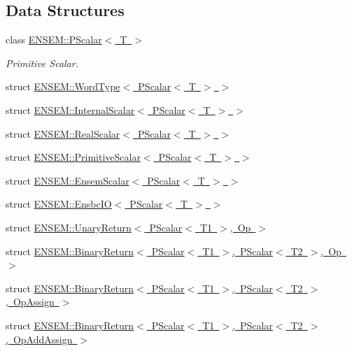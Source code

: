 \subsection*{Data Structures}
\begin{DoxyCompactItemize}
\item 
class \mbox{\hyperlink{classENSEM_1_1PScalar}{E\+N\+S\+E\+M\+::\+P\+Scalar$<$ T $>$}}
\begin{DoxyCompactList}\small\item\em Primitive Scalar. \end{DoxyCompactList}\item 
struct \mbox{\hyperlink{structENSEM_1_1WordType_3_01PScalar_3_01T_01_4_01_4}{E\+N\+S\+E\+M\+::\+Word\+Type$<$ P\+Scalar$<$ T $>$ $>$}}
\item 
struct \mbox{\hyperlink{structENSEM_1_1InternalScalar_3_01PScalar_3_01T_01_4_01_4}{E\+N\+S\+E\+M\+::\+Internal\+Scalar$<$ P\+Scalar$<$ T $>$ $>$}}
\item 
struct \mbox{\hyperlink{structENSEM_1_1RealScalar_3_01PScalar_3_01T_01_4_01_4}{E\+N\+S\+E\+M\+::\+Real\+Scalar$<$ P\+Scalar$<$ T $>$ $>$}}
\item 
struct \mbox{\hyperlink{structENSEM_1_1PrimitiveScalar_3_01PScalar_3_01T_01_4_01_4}{E\+N\+S\+E\+M\+::\+Primitive\+Scalar$<$ P\+Scalar$<$ T $>$ $>$}}
\item 
struct \mbox{\hyperlink{structENSEM_1_1EnsemScalar_3_01PScalar_3_01T_01_4_01_4}{E\+N\+S\+E\+M\+::\+Ensem\+Scalar$<$ P\+Scalar$<$ T $>$ $>$}}
\item 
struct \mbox{\hyperlink{structENSEM_1_1EnsbcIO_3_01PScalar_3_01T_01_4_01_4}{E\+N\+S\+E\+M\+::\+Ensbc\+I\+O$<$ P\+Scalar$<$ T $>$ $>$}}
\item 
struct \mbox{\hyperlink{structENSEM_1_1UnaryReturn_3_01PScalar_3_01T1_01_4_00_01Op_01_4}{E\+N\+S\+E\+M\+::\+Unary\+Return$<$ P\+Scalar$<$ T1 $>$, Op $>$}}
\item 
struct \mbox{\hyperlink{structENSEM_1_1BinaryReturn_3_01PScalar_3_01T1_01_4_00_01PScalar_3_01T2_01_4_00_01Op_01_4}{E\+N\+S\+E\+M\+::\+Binary\+Return$<$ P\+Scalar$<$ T1 $>$, P\+Scalar$<$ T2 $>$, Op $>$}}
\item 
struct \mbox{\hyperlink{structENSEM_1_1BinaryReturn_3_01PScalar_3_01T1_01_4_00_01PScalar_3_01T2_01_4_00_01OpAssign_01_4}{E\+N\+S\+E\+M\+::\+Binary\+Return$<$ P\+Scalar$<$ T1 $>$, P\+Scalar$<$ T2 $>$, Op\+Assign $>$}}
\item 
struct \mbox{\hyperlink{structENSEM_1_1BinaryReturn_3_01PScalar_3_01T1_01_4_00_01PScalar_3_01T2_01_4_00_01OpAddAssign_01_4}{E\+N\+S\+E\+M\+::\+Binary\+Return$<$ P\+Scalar$<$ T1 $>$, P\+Scalar$<$ T2 $>$, Op\+Add\+Assign $>$}}

\end{DoxyCompactItemize}
